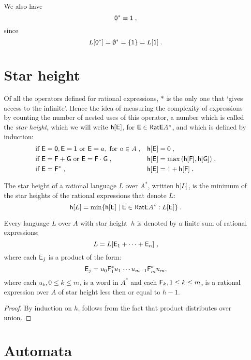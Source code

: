 We also have
\[
    {\mathsf{0}}^* \equiv {\mathsf{1}} \; ,
\]
since
\[
    L[{\mathsf{0}}^*] = \emptyset^* = \{ 1 \} = L[{\mathsf{1}}] \; .
\]

\section{Star height}

Of all the operators defined for rational expressions, $*$ is the only one that `gives access to the infinite'. Hence the idea of measuring the complexity of expressions by counting the number of nested uses of this operator, a number which is called the \emph{star height}, which we will write ${\mathsf{h}[{\mathsf{E}}]}$, for ${\mathsf{E}} \in {\mathsf{RatE}} A^*$, and which is defined by induction:
\begin{align*}
    &\text{if } {\mathsf{E}} = {\mathsf{0}}, {\mathsf{E}} = {\mathsf{1}} \text{ or } {\mathsf{E}} = a, \text{ for } a \in A \; , & &{\mathsf{h}[{\mathsf{E}}]} = 0 \; , \\
    &\text{if } {\mathsf{E}} = {\mathsf{F}} + {\mathsf{G}} \text{ or } {\mathsf{E}} = {\mathsf{F}} \cdot {\mathsf{G}}\; , & &{\mathsf{h}[{\mathsf{E}}]} = \max{({\mathsf{h}[{\mathsf{F}}]}, {\mathsf{h}[{\mathsf{G}}]})} \; , \\
    &\text{if } {\mathsf{E}} = {\mathsf{F}}^* \; , & &{\mathsf{h}[{\mathsf{E}}]} = 1 + {\mathsf{h}[{\mathsf{F}}]} \; .
\end{align*}

The star height of a rational language $L$ over $A^*$, written ${\mathsf{h}[L]}$, is the minimum of the star heights of the rational expressions that denote $L$:
\[
    {\mathsf{h}[L]} = \min \{ {\mathsf{h}[{\mathsf{E}}]} \mid {\mathsf{E}} \in {\mathsf{RatE}} A^*: L[{\mathsf{E}}] \} \; .
\]

\begin{lemma}\label{lm:star_height_distributivity}
    Every language $L$ over $A$ with star height~$h$ is denoted by a finite sum of rational expressions:
    \[
        L = L[ {\mathsf{E}}_1 + \dotsb + {\mathsf{E}}_n ] \; ,
    \]
    where each ${\mathsf{E}}_j$ is a product of the form:
    \[
        {\mathsf{E}}_j = u_0{\mathsf{F}}_1^*u_1 \dotsm u_{m-1}{\mathsf{F}}_m^*u_m,
    \]
    where each $u_k, 0 \leq k \leq m$, is a word in $A^*$ and each ${\mathsf{F}}_k, 1 \leq k \leq m$, is a rational expression over $A$ of star height less then or equal to $h-1$.
\end{lemma}

\begin{proof}
    By induction on $h$, follows from the fact that product distributes over union.
\end{proof}

\section{Automata}

